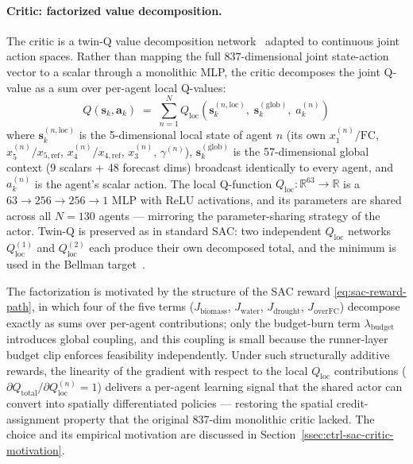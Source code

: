 \paragraph{Critic: factorized value decomposition.}
The critic is a twin-Q value decomposition network~\cite{sunehag2018vdn}
adapted to continuous joint action spaces. Rather than mapping the full
$837$-dimensional joint state-action vector to a scalar through a monolithic
MLP, the critic decomposes the joint Q-value as a sum over per-agent local
Q-values:
\begin{equation}
Q(\mathbf{s}_k, \mathbf{a}_k)
\;=\;
\sum_{n=1}^{N}
Q_{\mathrm{loc}}\!\left(
  \mathbf{s}_k^{(n,\mathrm{loc})},\;
  \mathbf{s}_k^{(\mathrm{glob})},\;
  a_k^{(n)}
\right)
\label{eq:vdn-critic}
\end{equation}
where $\mathbf{s}_k^{(n,\mathrm{loc})}$ is the 5-dimensional local state of
agent $n$ (its own $x_1^{(n)}/\mathrm{FC}$, $x_5^{(n)}/x_{5,\mathrm{ref}}$,
$x_4^{(n)}/x_{4,\mathrm{ref}}$, $x_3^{(n)}$, $\gamma^{(n)}$),
$\mathbf{s}_k^{(\mathrm{glob})}$ is the 57-dimensional global context
(9 scalars + 48 forecast dims) broadcast identically to every agent, and
$a_k^{(n)}$ is the agent's scalar action. The local Q-function
$Q_{\mathrm{loc}}: \mathbb{R}^{63} \to \mathbb{R}$ is a $63 \to 256 \to 256
\to 1$ MLP with ReLU activations, and its parameters are shared across all
$N = 130$ agents — mirroring the parameter-sharing strategy of the actor.
Twin-Q is preserved as in standard SAC: two independent $Q_{\mathrm{loc}}$
networks $Q_{\mathrm{loc}}^{(1)}$ and $Q_{\mathrm{loc}}^{(2)}$ each produce
their own decomposed total, and the minimum is used in the Bellman
target~\cite{haarnoja2018sac}.

The factorization is motivated by the structure of the SAC reward
\eqref{eq:sac-reward-path}, in which four of the five terms
($J_{\mathrm{biomass}}$, $J_{\mathrm{water}}$, $J_{\mathrm{drought}}$,
$J_{\mathrm{overFC}}$) decompose exactly as sums over per-agent
contributions; only the budget-burn term $\lambda_{\mathrm{budget}}$
introduces global coupling, and this coupling is small because the runner-layer
budget clip enforces feasibility independently. Under such structurally
additive rewards, the linearity of the gradient with respect to the local
$Q_{\mathrm{loc}}$ contributions
($\partial Q_{\mathrm{total}}/\partial Q_{\mathrm{loc}}^{(n)} = 1$)
delivers a per-agent learning signal that the shared actor can convert into
spatially differentiated policies — restoring the spatial credit-assignment
property that the original 837-dim monolithic critic lacked. The choice and
its empirical motivation are discussed in Section~\ref{ssec:ctrl-sac-critic-motivation}.

